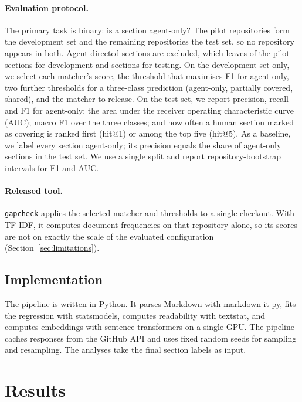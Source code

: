 \documentclass[sigconf,nonacm]{acmart}
\begin{document}
\paragraph{Evaluation protocol.} The primary task is binary: is a section agent-only? The
\nPilotRepos{} pilot repositories form the development set and the remaining repositories the test
set, so no repository appears in both. Agent-directed sections are excluded, which leaves
\detectorNDev{} of the \nPilotUnits{} pilot sections for development and \detectorNTest{} sections
for testing. On the development set only, we select each matcher's score, the threshold that
maximises F1 for agent-only, two further thresholds for a three-class prediction (agent-only,
partially covered, shared), and the matcher to release. On the test set, we report precision,
recall and F1 for agent-only; the area under the receiver operating characteristic curve (AUC);
macro F1 over the three classes; and how often a human section marked as covering is ranked first
(hit@1) or among the top five (hit@5). As a baseline, we label every section agent-only; its
precision equals the share of agent-only sections in the test set. We use a single split and report
repository-bootstrap intervals for F1 and AUC.

\paragraph{Released tool.} \texttt{gapcheck} applies the selected matcher and thresholds to a single
checkout. With TF-IDF, it computes document frequencies on that repository alone, so its scores are
not on exactly the scale of the evaluated configuration (Section~\ref{sec:limitations}).

\subsection{Implementation}

The pipeline is written in Python. It parses Markdown with markdown-it-py, fits the regression with
statsmodels, computes readability with textstat, and computes embeddings with sentence-transformers
on a single GPU. The pipeline caches responses from the GitHub API and uses fixed random seeds for
sampling and resampling. The analyses take the final section labels as input.

\section{Results}\label{sec:results}
\end{document}
